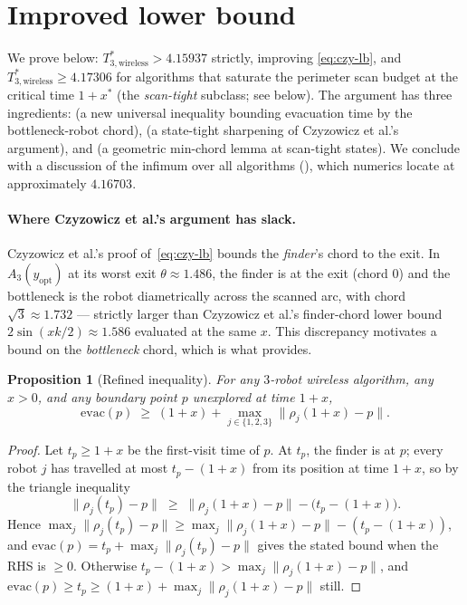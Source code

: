 \documentclass[11pt]{article}
\theoremstyle{plain}
\newtheorem{proposition}[theorem]{Proposition}
\theoremstyle{definition}
\theoremstyle{remark}
\begin{document}
\section{Improved lower bound}
\label{sec:lb}

We prove  below: $T^*_{3,\mathrm{wireless}} >
4.15937$ strictly, improving \eqref{eq:czy-lb}, and $T^*_{3,\mathrm{
wireless}} \ge 4.17306$ for algorithms that saturate the perimeter scan
budget at the critical time $1 + x^*$ (the \emph{scan-tight} subclass;
see below). The argument has three ingredients:
 (a new universal inequality bounding evacuation time
by the bottleneck-robot chord),  (a state-tight
sharpening of Czyzowicz et al.'s argument), and 
(a geometric min-chord lemma at scan-tight states). We conclude with
a discussion of the infimum over all algorithms
(), which numerics locate at approximately
$4.16703$.

\paragraph{Where Czyzowicz et al.'s argument has slack.} Czyzowicz et
al.'s proof of~\eqref{eq:czy-lb} bounds the \emph{finder}'s chord to the
exit. In $A_3(y_{\mathrm{opt}})$ at its worst exit $\theta \approx
1.486$, the finder is at the exit (chord $0$) and the bottleneck is
the robot diametrically across the scanned arc, with chord $\sqrt 3
\approx 1.732$ --- strictly larger than Czyzowicz et al.'s finder-chord
lower bound $2\sin(xk/2) \approx 1.586$ evaluated at the same $x$. This
discrepancy motivates a bound on the \emph{bottleneck} chord, which
is what  provides.

\begin{proposition}[Refined inequality]
\label{prop:refined}
For any $3$-robot wireless algorithm, any $x > 0$, and any boundary
point $p$ unexplored at time $1+x$,
\[
\mathrm{evac}(p) \;\ge\; (1+x) + \max_{j \in \{1,2,3\}} \bigl\|\rho_j(1+x) - p\bigr\|.
\]
\end{proposition}

\begin{proof}
Let $t_p \ge 1 + x$ be the first-visit time of $p$. At $t_p$, the finder
is at $p$; every robot $j$ has travelled at most $t_p - (1+x)$ from its
position at time $1+x$, so by the triangle inequality
\[
\|\rho_j(t_p) - p\| \;\ge\; \|\rho_j(1+x) - p\| - \bigl(t_p - (1+x)\bigr).
\]
Hence $\max_j \|\rho_j(t_p) - p\| \ge \max_j \|\rho_j(1+x) - p\| - (t_p - (1+x))$,
and $\mathrm{evac}(p) = t_p + \max_j \|\rho_j(t_p) - p\|$ gives the stated bound
when the RHS is $\ge 0$. Otherwise $t_p - (1+x) > \max_j \|\rho_j(1+x) - p\|$,
and $\mathrm{evac}(p) \ge t_p \ge (1+x) + \max_j \|\rho_j(1+x) - p\|$ still.
\end{proof}
\end{document}
